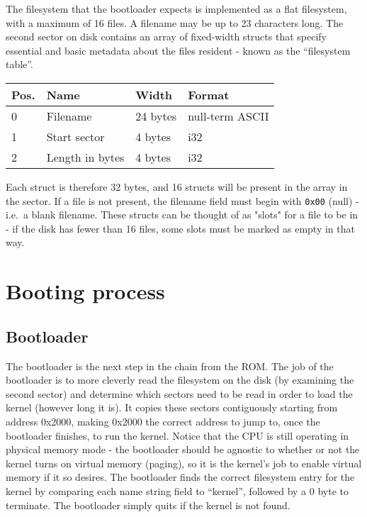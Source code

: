 \documentclass[12pt,a4paper]{report}
\begin{document}
The filesystem that the bootloader expects is implemented as a flat filesystem, with a maximum of 16 files. A filename may be up to 23 characters long. The second sector on disk contains an array of fixed-width structs that specify essential and basic metadata about the files resident - known as the ``filesystem table''.
\begin{center}
  \begin{tabular}{|l|l|l|l|}
    \hline
    Pos. & Name            & Width    & Format          \\
    \hline
    0    & Filename        & 24 bytes & null-term ASCII \\
    1    & Start sector    & 4 bytes  & i32             \\
    2    & Length in bytes & 4 bytes  & i32             \\
    \hline
  \end{tabular}
\end{center}
Each struct is therefore 32 bytes, and 16 structs will be present in the array in the sector. If a file is not present, the filename field must begin with \texttt{0x00} (null) - i.e.~a blank filename. These structs can be thought of as "slots" for a file to be in - if the disk has fewer than 16 files, some slots must be marked as empty in that way.


\section{Booting process}

\subsection*{Bootloader}

The bootloader is the next step in the chain from the ROM. The job of the bootloader is to more cleverly read the filesystem on the disk (by examining the second sector) and determine which sectors need to be read in order to load the kernel (however long it is). It copies these sectors contiguously starting from address 0x2000, making 0x2000 the correct address to jump to, once the bootloader finishes, to run the kernel. Notice that the CPU is still operating in physical memory mode - the bootloader should be agnostic to whether or not the kernel turns on virtual memory (paging), so it is the kernel's job to enable virtual memory if it so desires. The bootloader finds the correct filesystem entry for the kernel by comparing each name string field to ``kernel'', followed by a 0 byte to terminate. The bootloader simply quits if the kernel is not found.
\end{document}
